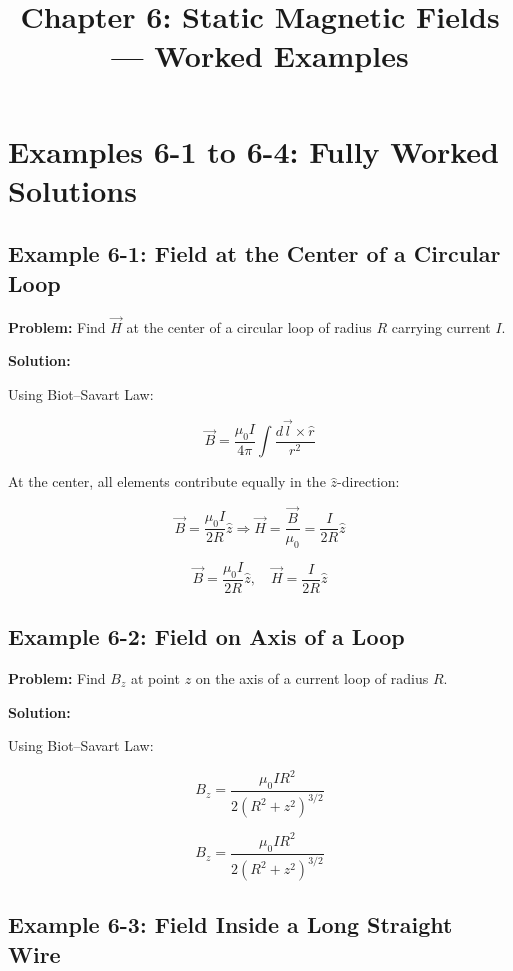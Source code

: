 \documentclass[12pt]{article}
\title{Chapter 6: Static Magnetic Fields — Worked Examples}
\author{}
\date{}
\begin{document}
\maketitle
\tableofcontents
\newpage

\section*{Examples 6-1 to 6-4: Fully Worked Solutions}

\subsection*{Example 6-1: Field at the Center of a Circular Loop}

\textbf{Problem:}  
Find \( \vec{H} \) at the center of a circular loop of radius \( R \) carrying current \( I \).

\textbf{Solution:}

Using Biot–Savart Law:

\[
\vec{B} = \frac{\mu_0 I}{4\pi} \int \frac{d\vec{l} \times \hat{r}}{r^2}
\]

At the center, all elements contribute equally in the \( \hat{z} \)-direction:

\[
\vec{B} = \frac{\mu_0 I}{2R} \hat{z}
\Rightarrow \vec{H} = \frac{\vec{B}}{\mu_0} = \frac{I}{2R} \hat{z}
\]

\begin{tcolorbox}
\[
\boxed{\vec{B} = \frac{\mu_0 I}{2R} \hat{z}}, \quad
\boxed{\vec{H} = \frac{I}{2R} \hat{z}}
\]
\end{tcolorbox}

\subsection*{Example 6-2: Field on Axis of a Loop}

\textbf{Problem:}  
Find \( B_z \) at point \( z \) on the axis of a current loop of radius \( R \).

\textbf{Solution:}

Using Biot–Savart Law:

\[
B_z = \frac{\mu_0 I R^2}{2 (R^2 + z^2)^{3/2}}
\]

\begin{tcolorbox}
\[
\boxed{B_z = \frac{\mu_0 I R^2}{2 (R^2 + z^2)^{3/2}}}
\]
\end{tcolorbox}

\subsection*{Example 6-3: Field Inside a Long Straight Wire}
\end{document}
